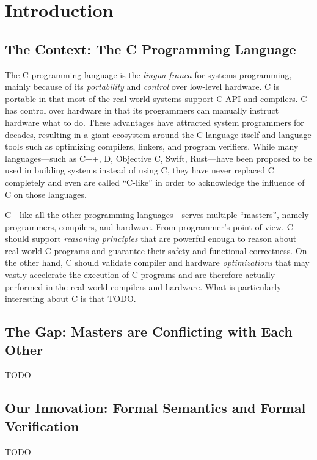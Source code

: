 \section{Introduction}
\label{sec:introduction}

\subsection{The Context: The C Programming Language}

The C programming language is the \emph{lingua franca} for systems programming, mainly because of
its \emph{portability} and \emph{control} over low-level hardware.  C is portable in that most of
the real-world systems support C API and compilers.  C has control over hardware in that its
programmers can manually instruct hardware what to do.  These advantages have attracted system
programmers for decades, resulting in a giant ecosystem around the C language itself and language
tools such as optimizing compilers, linkers, and program verifiers.  While many languages---such as
C++, D, Objective C, Swift, Rust---have been proposed to be used in building systems instead of
using C, they have never replaced C completely and even are called ``C-like'' in order to
acknowledge the influence of C on those languages.

C---like all the other programming languages---serves multiple ``masters'', namely programmers,
compilers, and hardware.  From programmer's point of view, C should support \emph{reasoning
  principles} that are powerful enough to reason about real-world C programs and guarantee their
safety and functional correctness.  On the other hand, C should validate compiler and hardware
\emph{optimizations} that may vastly accelerate the execution of C programs and are therefore
actually performed in the real-world compilers and hardware.  What is particularly interesting about
C is that TODO.


\subsection{The Gap: Masters are Conflicting with Each Other}

TODO


\subsection{Our Innovation: Formal Semantics and Formal Verification}

TODO


